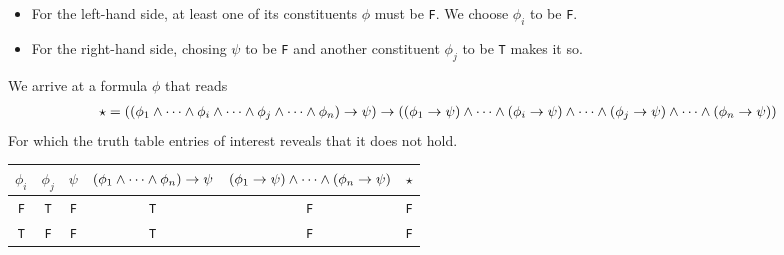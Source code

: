 \begin{itemize}
	\item For the left-hand side, at least one of its constituents $\phi$ must be
{\tt F}. We choose $\phi_i$ to be {\tt F}.

	\item For the right-hand side, chosing $\psi$ to be {\tt F} and another constituent
$\phi_j$ to be {\tt T} makes it so.
\end{itemize}

\noindent We arrive at a formula $\phi$ that reads
\scriptsize
\begin{align*}
	\star = 
	(
		(\phi_1 \land \dots \land \phi_i \land \dots \land \phi_j \land \dots \land \phi_n) \to \psi
	)
	\to
	(
		(\phi_1 \to \psi) \land \dots \land
		(\phi_i \to \psi) \land \dots \land
		(\phi_j \to \psi) \land \dots \land
		(\phi_n \to \psi)
	)
\end{align*}
\normalsize
For which the truth table entries of interest reveals that it does not hold.

\begin{tabular}{ccc|c|c|c}
	$\phi_i$ & $\phi_j$ & $\psi$
	& $(\phi_1 \land \dots \land \phi_n) \to \psi$
	& $(\phi_1 \to \psi) \land \dots \land (\phi_n \to \psi)$
	& $\star$ \\ \hline
	{\tt F} & {\tt T} & {\tt F} & {\tt T} & {\tt F} & {\tt F} \\
	{\tt T} & {\tt F} & {\tt F} & {\tt T} & {\tt F} & {\tt F} \\
\end{tabular}
